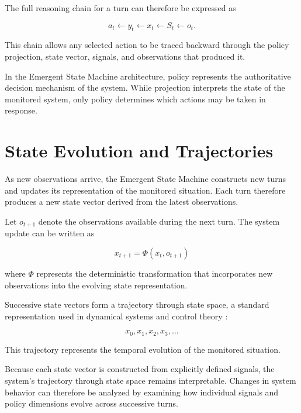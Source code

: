 \documentclass[11pt]{article}
\begin{document}
The full reasoning chain for a turn can therefore be expressed as

\begin{equation}
a_t \leftarrow y_t \leftarrow x_t \leftarrow S_t \leftarrow o_t.
\end{equation}

This chain allows any selected action to be traced backward through the policy projection, state vector, signals, and observations that produced it.

In the Emergent State Machine architecture, policy represents the authoritative decision mechanism of the system. While projection interprets the state of the monitored system, only policy determines which actions may be taken in response.




\section{State Evolution and Trajectories}

As new observations arrive, the Emergent State Machine constructs new turns and updates its representation of the monitored situation. Each turn therefore produces a new state vector derived from the latest observations.

Let $o_{t+1}$ denote the observations available during the next turn. The system update can be written as

\begin{equation}
x_{t+1} = \Phi(x_t, o_{t+1})
\end{equation}

where $\Phi$ represents the deterministic transformation that incorporates new observations into the evolving state representation.

Successive state vectors form a trajectory through state space, a standard representation used in dynamical systems and control theory \citep{astrom2010,bertsekas1995}:

\begin{equation}
x_0, x_1, x_2, x_3, \dots
\end{equation}

This trajectory represents the temporal evolution of the monitored situation.

Because each state vector is constructed from explicitly defined signals, the system's trajectory through state space remains interpretable. Changes in system behavior can therefore be analyzed by examining how individual signals and policy dimensions evolve across successive turns.
\end{document}
